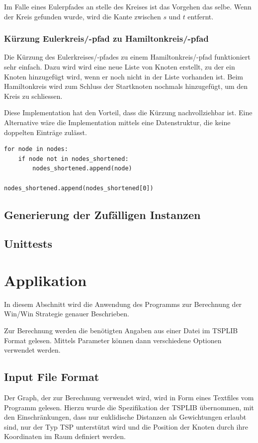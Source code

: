 \documentclass[11pt,a4paper]{article}
\begin{document}
\begin{flushleft}
   Im Falle eines Eulerpfades an stelle des Kreises ist das Vorgehen das selbe. Wenn der Kreis gefunden wurde, wird die Kante zwischen $s$ und $t$ entfernt.
\end{flushleft}

\subsubsection{Kürzung Eulerkreis/-pfad zu Hamiltonkreis/-pfad}
Die Kürzung des Eulerkreises/-pfades zu einem Hamiltonkreis/-pfad funktioniert sehr einfach. Dazu wird wird eine neue Liste von Knoten erstellt, zu der ein Knoten hinzugefügt wird, wenn er noch nicht in der Liste vorhanden ist. Beim Hamiltonkreis wird zum Schluss der Startknoten nochmals hinzugefügt, um den Kreis zu schliessen. 

Diese Implementation hat den Vorteil, dass die Kürzung nachvollziehbar ist. Eine Alternative wäre die Implementation mittels eine Datenstruktur, die keine doppelten Einträge zulässt.

\begin{verbatim}
for node in nodes:
    if node not in nodes_shortened:
        nodes_shortened.append(node)

nodes_shortened.append(nodes_shortened[0])
\end{verbatim}

\subsection{Generierung der Zufälligen Instanzen}
\subsection{Unittests}

\newpage

\section{Applikation}
In diesem Abschnitt wird die Anwendung des Programms zur Berechnung der Win/Win Strategie genauer Beschrieben.

Zur Berechnung werden die benötigten Angaben aus einer Datei im TSPLIB Format gelesen. Mittels Parameter können dann verschiedene Optionen verwendet werden.

\subsection{Input File Format}
Der Graph, der zur Berechnung verwendet wird, wird in Form eines Textfiles vom Programm gelesen. Hierzu wurde die Spezifikation der TSPLIB übernommen, mit den Einschränkungen, dass nur euklidische Distanzen als Gewichtungen erlaubt sind, nur der Typ TSP unterstützt wird und die Position der Knoten durch ihre Koordinaten im Raum definiert werden.
\end{document}
